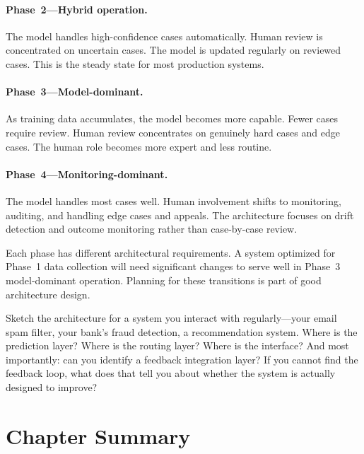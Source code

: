 \paragraph{Phase~2---Hybrid operation.} The model handles high-confidence cases automatically. Human review is concentrated on uncertain cases. The model is updated regularly on reviewed cases. This is the steady state for most production \hitl systems.

\paragraph{Phase~3---Model-dominant.} As training data accumulates, the model becomes more capable. Fewer cases require review. Human review concentrates on genuinely hard cases and edge cases. The human role becomes more expert and less routine.

\paragraph{Phase~4---Monitoring-dominant.} The model handles most cases well. Human involvement shifts to monitoring, auditing, and handling edge cases and appeals. The architecture focuses on drift detection and outcome monitoring rather than case-by-case review.

Each phase has different architectural requirements. A system optimized for Phase~1 data collection will need significant changes to serve well in Phase~3 model-dominant operation. Planning for these transitions is part of good \hitl architecture design.

\begin{trythis}
Sketch the \hitl architecture for a system you interact with regularly---your email spam filter, your bank's fraud detection, a recommendation system. Where is the prediction layer? Where is the routing layer? Where is the interface? And most importantly: can you identify a feedback integration layer? If you cannot find the feedback loop, what does that tell you about whether the system is actually designed to improve?
\end{trythis}

\section*{Chapter Summary}

